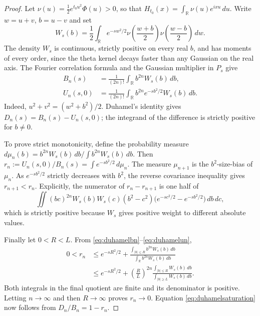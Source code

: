 \begin{proof}
Let
$\nu(u)=\frac12e^{t_0u^2}\Phi(u)>0$,
so that $H_{t_0}(x)=\int_{\mathbb R}
\nu(u)e^{ixu}\,du$.
Write $w=u+v$, $b=u-v$ and set
\[
W_s(b)=\frac12\int_{\mathbb R}
e^{-sw^2/2}
\nu\left(\frac{w+b}{2}\right)
\nu\left(\frac{w-b}{2}\right)\,dw.
\]
The density $W_s$ is continuous,
strictly positive on every real $b$,
and has moments of every order,
since the theta kernel decays faster
than any Gaussian on the real axis.
The Fourier correlation formula and
the Gaussian multiplier in $P_s$ give
\begin{align}
B_n(s)&=\frac1{(2n)!}
\int_{\mathbb R}b^{2n}W_s(b)\,db,
\label{eq:duhamelbn}\\
U_n(s,0)&=\frac1{(2n)!}
\int_{\mathbb R}b^{2n}e^{-sb^2/2}
W_s(b)\,db.
\label{eq:duhamelun}
\end{align}
Indeed, $u^2+v^2=(w^2+b^2)/2$.
Duhamel's identity gives
$D_n(s)=B_n(s)-U_n(s,0)$;
the integrand of the difference is
strictly positive for $b\ne0$.

To prove strict monotonicity, define
the probability measure
$d\mu_n(b)=b^{2n}W_s(b)\,db/
\int b^{2n}W_s(b)\,db$.
Then $r_n:=U_n(s,0)/B_n(s)
=\int e^{-sb^2/2}\,d\mu_n$.
The measure $\mu_{n+1}$ is the
$b^2$-size-bias of $\mu_n$.
As $e^{-sb^2/2}$ strictly decreases
with $b^2$, the reverse covariance
inequality gives $r_{n+1}<r_n$.
Explicitly, the numerator of
$r_n-r_{n+1}$ is one half of
\[
\iint (bc)^{2n}W_s(b)W_s(c)
(b^2-c^2)
\bigl(e^{-sc^2/2}-e^{-sb^2/2}\bigr)
\,db\,dc,
\]
which is strictly positive because
$W_s$ gives positive weight to
different absolute values.

Finally let $0<R<L$. From
\eqref{eq:duhamelbn}--\eqref{eq:duhamelun},
\begin{align}
0<r_n&\le e^{-sR^2/2}
+\frac{\int_{|b|\le R}b^{2n}W_s(b)\,db}
{\int_{\mathbb R}b^{2n}W_s(b)\,db}
\nonumber\\
&\le e^{-sR^2/2}
+\left(\frac RL\right)^{2n}
\frac{\int_{|b|\le R}W_s(b)\,db}
{\int_{|b|\ge L}W_s(b)\,db}.
\label{eq:duhamelrate}
\end{align}
Both integrals in the final quotient
are finite and its denominator is
positive. Letting $n\to\infty$
and then $R\to\infty$ proves
$r_n\to0$. Equation
\eqref{eq:duhamelsaturation}
now follows from $D_n/B_n=1-r_n$.
\end{proof}


